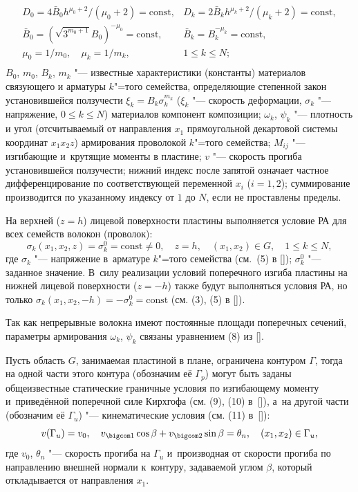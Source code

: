 \begin{equation} \label{yank:eq4}
\begin{array}{ll}
D_0  =4\bar{B}_0  h^{\mu_0  +2}/(\mu_0  +2)=\text{const}, & D_k =2\bar{B}_k h^{\mu_k +2}/(\mu_k  +2)=\text{const}, \\
\bar{B}_0 =(\sqrt{3^{m_0  +1}}B_0 )^{-\mu_0 }=\text{const}, & \bar{B}_k  =B_k ^{-\mu_k }=\text{const},\\
\mu_0  ={1}/{m_0 }, \quad \mu_k ={1}/{m_k },  & 1\le k\le N; \\
\end{array}
\end{equation}
$B_0 $, $m_0 $, $B_k $, $m_k $ "--- известные характеристики (константы) материалов связующего и арматуры $k$"=того семейства,
определяющие степенной закон установившейся ползучести $\xi_k=B_k \sigma_k^{m_k }$ ($\xi_k$ "--- скорость деформации, $\sigma_k$ "--- напряжение, $0\leq k\leq N$) материалов компонент композиции; $\omega_k $, $\psi_k $ "--- плотность и угол (отсчитываемый от направления $x_1 $ прямоугольной декартовой системы координат $x_1 x_2 z$) армирования проволокой $k$"=того семейства; $M_{ij}$ "--- изгибающие и~крутящие моменты в пластине; $v$ "--- скорость прогиба установившейся ползучести; нижний индекс после запятой означает частное дифференцирование по соответствующей переменной $x_{i}$ ($i=1, 2$); суммирование производится по указанному индексу от $1$ до $N$, если не проставлены пределы.

На верхней ($z=h$) лицевой поверхности пластины выполняется условие РА для всех семейств волокон (проволок):
\begin{equation} \label{yank:eq5}
\sigma_k (x_1 , x_2 , z)=\sigma_k ^0 =\text{const}\neq0, \quad z=h, \quad (x_1 , x_2 )\in G, \quad 1\leq k\leq N,
\end{equation}
где $\sigma_k $ "--- напряжение в~арматуре $k$"=того семейства (см.~(5) в []); 
$\sigma_k ^0 $ "--- заданное значение.
В~силу реализации условий поперечного изгиба пластины на нижней лицевой поверхности ($z=-h$) также будут выполняться условия РА, но только $\sigma_k (x_1 , x_2 ,-h)=-\sigma_k ^0 =\text{const}$ (см. (3), (5) в []).

Так как непрерывные волокна имеют постоянные площади поперечных сечений, параметры армирования $\omega_k $, $\psi_k $ связаны уравнением (8) из [].

Пусть область $G$, занимаемая пластиной в плане, ограничена контуром $\Gamma$, тогда на одной части этого контура (обозначим её
$\Gamma_{p}$) могут быть заданы общеизвестные статические граничные условия по изгибающему моменту и~приведённой поперечной силе Кирхгофа (см. (9), (10) в~[]), а~на другой части (обозначим её $\Gamma_{u}$) "--- кинематические условия
(см. (11) в~[]):
\begin{equation} \label{yank:eq6}
v(\Gamma_{u})=v_0 , \quad v_{\bigcom 1}\cos\beta+v_{\bigcom 2}\sin\beta=\theta_{n}, \quad (x_1 , x_2 )\in \Gamma_{u},
\end{equation}
где $v_0$, $\theta_{n}$ "--- скорость прогиба на $\Gamma_{u}$ и~производная от скорости прогиба по направлению внешней нормали к~контуру, задаваемой углом $\beta$, который откладывается от направления $x_1 $.

